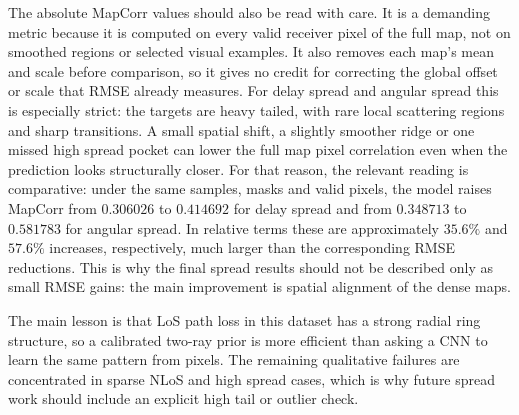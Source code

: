 The absolute MapCorr values should also be read with care. It is a demanding
metric because it is computed on every valid receiver pixel of the full map,
not on smoothed regions or selected visual examples. It also removes each
map's mean and scale before comparison, so it gives no credit for correcting
the global offset or scale that RMSE already measures. For delay spread and
angular spread this is especially strict: the targets are heavy tailed, with
rare local scattering regions and sharp transitions. A small spatial shift, a
slightly smoother ridge or one missed high spread pocket can lower the full map
pixel correlation even when the prediction looks structurally closer. For that
reason, the relevant reading is comparative: under the same samples, masks and
valid pixels, the
model raises MapCorr from \(0.306026\) to \(0.414692\) for delay spread and
from \(0.348713\) to \(0.581783\) for angular spread. In relative terms these
are approximately \(35.6\%\) and \(57.6\%\) increases, respectively, much larger
than the corresponding RMSE reductions. This is why the final spread results
should not be described only as small RMSE gains: the main improvement is
spatial alignment of the dense maps.

The main lesson is that LoS path loss in this dataset has a strong radial ring
structure, so a calibrated two-ray prior is more efficient than asking a CNN to
learn the same pattern from pixels. The remaining qualitative failures are
concentrated in sparse NLoS and high spread cases, which is why future spread
work should include an explicit high tail or outlier check.
